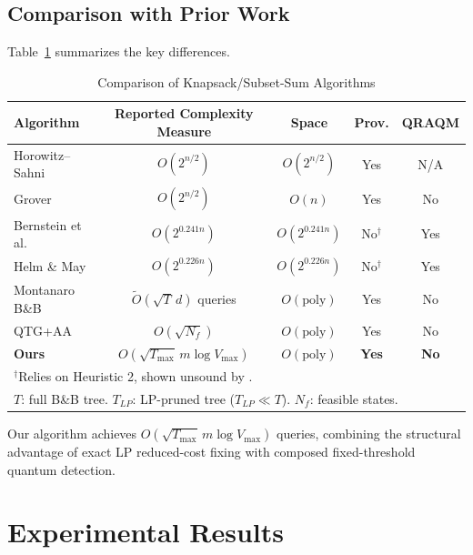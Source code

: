 \documentclass[conference]{IEEEtran} \IEEEoverridecommandlockouts
\begin{document}
\subsection{Comparison with Prior Work}

Table~\ref{tab:comparison} summarizes the key differences.

\begin{table}[htbp] \caption{Comparison of Knapsack/Subset-Sum Algorithms} \label{tab:comparison} \begin{center} \begin{tabular}{lcccc} \toprule \textbf{Algorithm} & \textbf{Reported Complexity Measure} & \textbf{Space} & \textbf{Prov.} & \textbf{QRAQM} \\ \midrule Horowitz--Sahni & $O(2^{n/2})$ & $O(2^{n/2})$ & Yes & N/A \\ Grover & $O(2^{n/2})$ & $O(n)$ & Yes & No \\ Bernstein et al. & $O(2^{0.241n})$ & $O(2^{0.241n})$ & No$^\dagger$ & Yes \\ Helm \& May & $O(2^{0.226n})$ & $O(2^{0.226n})$ & No$^\dagger$ & Yes \\ Montanaro B\&B & $\tilde{O}(\sqrt{T}\,d)$ queries & $O(\text{poly})$ & Yes & No \\ QTG+AA & $O(\sqrt{N_f})$ & $O(\text{poly})$ & Yes & No \\ \textbf{Ours} & $O(\sqrt{T_{\max}}\,m\log V_{\max})$ & $O(\text{poly})$ & \textbf{Yes} & \textbf{No} \\ \bottomrule \multicolumn{5}{l}{\footnotesize $^\dagger$Relies on Heuristic 2, shown unsound by \cite{bonnetain2020improved}.} \\ \multicolumn{5}{l}{\footnotesize $T$: full B\&B tree. $T_{LP}$: LP-pruned tree ($T_{LP} \ll T$). $N_f$: feasible states.} \end{tabular} \end{center} \end{table}

Our algorithm achieves $O\!\left(\sqrt{T_{\max}}\,m\log V_{\max}\right)$ queries, combining the structural advantage of exact LP reduced-cost fixing with composed fixed-threshold quantum detection.




\section{Experimental Results} \label{sec:experiments}
\end{document}
